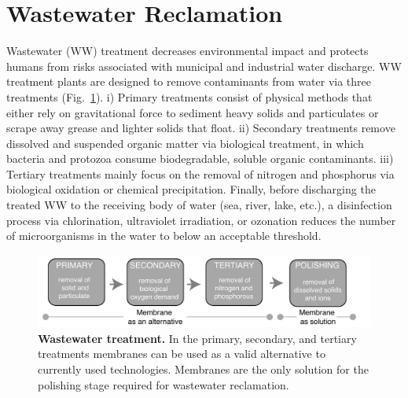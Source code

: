 \section{Wastewater Reclamation}
Wastewater (WW) treatment decreases environmental impact and protects humans from risks associated with municipal and industrial water discharge. WW treatment plants are designed to remove contaminants from water via three treatments (Fig.~\ref{fig2_intro}). i) Primary treatments consist of physical methods that either rely on gravitational force to sediment heavy solids and particulates or scrape away grease and lighter solids that float. ii) Secondary treatments remove dissolved and suspended organic matter via biological treatment, in which bacteria and protozoa consume biodegradable, soluble organic contaminants. iii) Tertiary treatments mainly focus on the removal of nitrogen and phosphorus via biological oxidation or chemical precipitation. Finally, before discharging the treated WW to the receiving body of water (sea, river, lake, etc.), a disinfection process via chlorination, ultraviolet irradiation, or ozonation reduces the number of microorganisms in the water to below an acceptable threshold. \cite{qasim2017wastewater}
\begin{figure}
  \centering
  \includegraphics[width=6in]{intro/Fig2.pdf}
  \caption{\textbf{Wastewater treatment.} In the primary, secondary, and tertiary treatments membranes can be used as a valid alternative to currently used technologies. Membranes are the only solution for the polishing stage required for wastewater reclamation.}
  \label{fig2_intro}
\end{figure}
 


